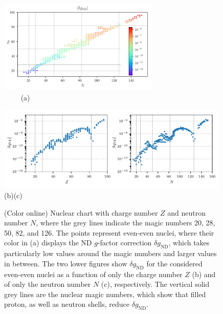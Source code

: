 \begin{figure}
  \centering
  \begin{minipage}[b]{\textwidth}
    \includegraphics[width=0.68\textwidth]{pics/dgnuclchart.pdf}\\
    $\qquad \, \,$(a)
  \end{minipage}
  \hfill
  \begin{minipage}[b]{\textwidth}
    \includegraphics[width=0.99\textwidth]{pics/dgZN.pdf}\\
    \hspace{1.3cm}(b)\hspace{8.3cm}(c)
    \caption{\label{fig:dg}(Color online) Nuclear chart with charge number $Z$ and neutron number $N$, where the grey lines indicate the magic numbers 20, 28, 50, 82, and 126. The points represent even-even nuclei, where their color in (a) displays the ND $g$-factor correction $\delta g_{\text{ND}}$, which takes particularly low values around the magic numbers and larger values in between. The two lower figures show $\delta g_{\text{ND}}$ for the considered even-even nuclei as a function of only the charge number $Z$ (b) and of only the neutron number $N$ (c), respectively. The vertical solid grey lines are the nuclear magic numbers, which show that filled proton, as well as neutron shells, reduce $\delta g_{\text{ND}}$.}
  \end{minipage}
\end{figure}

